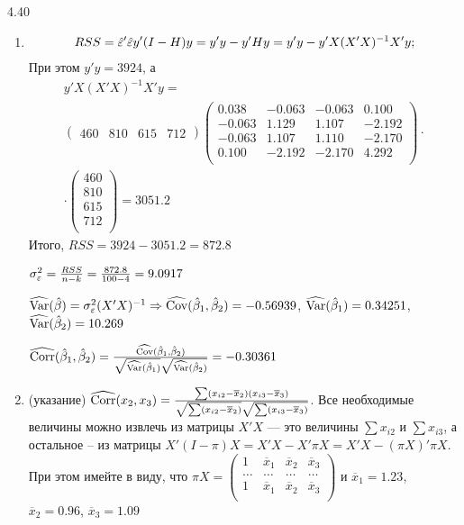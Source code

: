 \begin{solution}{{4.40}}
\begin{enumerate}
\item
\begin{multline*}
RSS = \hat{\varepsilon}'\hat{\varepsilon} y' (I - H) y = y' y - y'Hy = y'y - y' X(X'X)^{-1}X'y ;
\end{multline*}
При этом $y'y=3924$,  а
\begin{multline*}
y' X(X'X)^{-1}X'y= \\
 \begin{pmatrix}
460 & 810 & 615 & 712
\end{pmatrix} \begin{pmatrix}
0.038 & -0.063 & -0.063 & 0.100 \\
-0.063 & 1.129 & 1.107 & -2.192 \\
-0.063 & 1.107 & 1.110 & -2.170 \\
0.100 & -2.192 & -2.170 & 4.292 \\
\end{pmatrix} \cdot \\
\cdot
\begin{pmatrix}
460\\
810\\
615\\
712\\
\end{pmatrix} = 3051.2
\end{multline*}
Итого, $RSS= 3924 - 3051.2 = 872.8$

$\sigma_{\varepsilon}^2 = \frac{RSS}{n-k} = \frac{872.8}{100-4} = 9.0917$

$\widehat{\operatorname{Var}}(\hat{\beta}) = \sigma_{\varepsilon}^2 (X' X)^{-1} \Rightarrow \widehat{\operatorname{Cov}}(\hat{\beta}_1, \hat{\beta}_2) = -0.56939$, $\widehat{\operatorname{Var}}(\hat{\beta}_1) = 0.34251$, $\widehat{\operatorname{Var}}(\hat{\beta}_2) = 10.269$

$\widehat{\operatorname{Corr}}(\hat{\beta}_1, \hat{\beta}_2) = \frac{\widehat{\operatorname{Cov}}(\hat{\beta}_1, \hat{\beta}_2)}{\sqrt{\widehat{\operatorname{Var}}(\hat{\beta}_1)}\sqrt{\widehat{\operatorname{Var}}(\hat{\beta}_2)}} = -0.30361$

\item(указание) $\widehat{\operatorname{Corr}}(x_2, x_3) = \frac{\sum (x_{i2} - \overline{x}_2) (x_{i3} - \overline{x}_3)}{\sqrt{\sum (x_{i2} - \overline{x}_2)}\sqrt{\sum (x_{i3} - \overline{x}_3)}}$. Все необходимые величины можно извлечь из матрицы $X' X$ — это величины $\sum x_{i2}$ и $\sum x_{i3}$, а остальное -- из матрицы $X' (I - \pi) X = X' X - X' \pi X = X' X - (\pi X)' \pi X$. При этом имейте в виду, что
$\pi X = \begin{pmatrix}
1 & \overline{x}_1 & \overline{x}_2 & \overline{x}_3 \\
\ldots & \ldots & \ldots & \ldots \\
1 & \overline{x}_1 & \overline{x}_2 & \overline{x}_3 \\
\end{pmatrix}$ и $\overline{x}_1 = 1.23$, $\overline{x}_2 = 0.96$, $\overline{x}_3 = 1.09$


\end{enumerate}
\end{solution}
